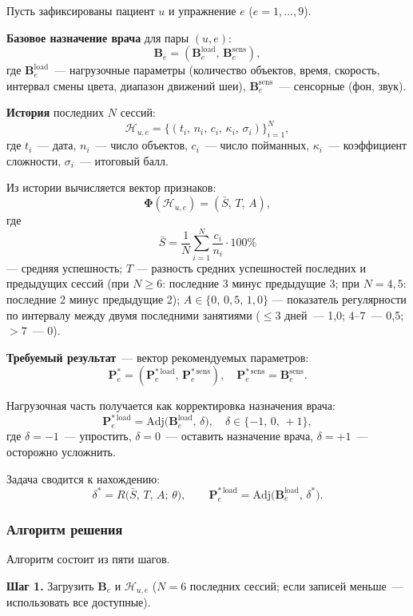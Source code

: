 Пусть зафиксированы пациент $u$ и упражнение $e$ ($e = 1, \ldots, 9$).

\textbf{Базовое назначение врача} для пары $(u, e)$:
\[
\mathbf{B}_e = (\mathbf{B}_e^{\mathrm{load}},\, \mathbf{B}_e^{\mathrm{sens}}),
\]
где $\mathbf{B}_e^{\mathrm{load}}$~--- нагрузочные параметры (количество
объектов, время, скорость, интервал смены цвета, диапазон движений шеи),
$\mathbf{B}_e^{\mathrm{sens}}$~--- сенсорные (фон, звук).

\textbf{История} последних $N$ сессий:
\[
\mathcal{H}_{u,e} = \bigl\{ (t_i,\, n_i,\, c_i,\, \kappa_i,\, \sigma_i) \bigr\}_{i=1}^{N},
\]
где $t_i$~--- дата, $n_i$~--- число объектов, $c_i$~--- число пойманных,
$\kappa_i$~--- коэффициент сложности, $\sigma_i$~--- итоговый балл.

Из истории вычисляется вектор признаков:
\[
\boldsymbol{\Phi}(\mathcal{H}_{u,e}) = (\bar{S},\, T,\, A),
\]
где
\[
\bar{S} = \frac{1}{N}\sum_{i=1}^{N}\frac{c_i}{n_i} \cdot 100\%
\]
--- средняя успешность;
$T$ --- разность средних успешностей последних и предыдущих сессий
(при $N \geq 6$: последние 3 минус предыдущие 3; при $N = 4, 5$:
последние 2 минус предыдущие 2);
$A \in \{0,\, 0{,}5,\, 1{,}0\}$ --- показатель регулярности по интервалу
между двумя последними занятиями ($\leq 3$ дней~--- 1{,}0;
$4$--$7$~--- 0{,}5; $> 7$~--- 0).

\textbf{Требуемый результат}~--- вектор рекомендуемых параметров:
\[
\mathbf{P}^{*}_e = (\mathbf{P}_e^{*\,\mathrm{load}},\, \mathbf{P}_e^{*\,\mathrm{sens}}),
\quad \mathbf{P}_e^{*\,\mathrm{sens}} = \mathbf{B}_e^{\mathrm{sens}}.
\]

Нагрузочная часть получается как корректировка назначения врача:
\[
\mathbf{P}_e^{*\,\mathrm{load}} = \mathrm{Adj}\bigl(\mathbf{B}_e^{\mathrm{load}},\, \delta\bigr),
\quad \delta \in \{-1,\, 0,\, +1\},
\]
где $\delta = -1$~--- упростить, $\delta = 0$~--- оставить назначение
врача, $\delta = +1$~--- осторожно усложнить.

Задача сводится к нахождению:
\[
\delta^{*} = R\bigl(\bar{S},\, T,\, A;\, \theta\bigr),
\qquad
\mathbf{P}_e^{*\,\mathrm{load}} = \mathrm{Adj}\bigl(\mathbf{B}_e^{\mathrm{load}},\, \delta^{*}\bigr).
\]

\subsubsection{Алгоритм решения}

Алгоритм состоит из пяти шагов.

\textbf{Шаг 1.} Загрузить $\mathbf{B}_e$ и $\mathcal{H}_{u,e}$
($N = 6$ последних сессий; если записей меньше~--- использовать все
доступные).

